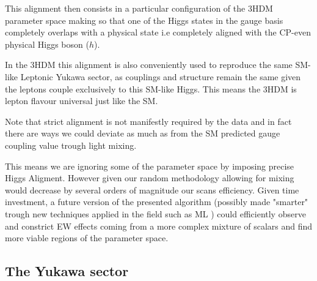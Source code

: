 This alignment then consists in a particular configuration of the 3HDM parameter space making so that one of the Higgs states in the gauge basis completely overlaps with a physical state i.e completely aligned with the CP-even physical Higgs boson ($h$). 

In the 3HDM this alignment is also conveniently used to reproduce the same SM-like Leptonic Yukawa sector, as couplings and structure remain the same given the leptons couple exclusively to this SM-like Higgs. 
%
This means the 3HDM is lepton flavour universal just like the SM. 

Note that strict alignment is not manifestly required by the data and in fact there are ways we could deviate as much as  from the SM predicted gauge coupling value trough light mixing. 

This  means we are ignoring some of the parameter space by imposing precise Higgs Aligment.
%
However given our random methodology allowing for mixing\Joaoadd{,} would decrease by several orders of magnitude our scans efficiency. 
%
Given time investment, a future version of the presented algorithm (possibly made "smarter" trough new techniques applied in the field such as ML {\color{red}{citar Pino ou Felipe}} ) could efficiently observe and constrict EW effects coming from a more complex mixture of scalars and find more viable regions of the parameter space.  

\subsection{The Yukawa sector}

